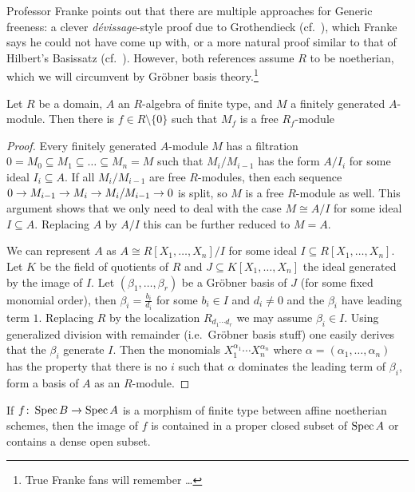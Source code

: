 \documentclass[a4paper,parskip=half,numbers=enddot, DIV=12]{scrreprt}
\begin{document}
Professor Franke points out that there are multiple approaches for Generic freeness: a clever \emph{dévissage}-style proof due to Grothendieck (cf.\ \cite[Theorem~14.4]{eisenbudCommAlg}), which Franke says he could not have come up with, or a more natural proof similar to that of Hilbert's Basissatz (cf.\ \cite[\S 24]{matsumuraCRT}). However, both references assume $R$ to be noetherian, which we will circumvent by Gröbner basis theory.\footnote{True Franke fans will remember \ldots}
\begin{prop}
	Let $R$ be a domain, $A$ an $R$-algebra of finite type, and $M$ a finitely generated $A$-module. Then there is $f\in R\setminus\{0\}$ such that $M_f$ is a free $R_f$-module
\end{prop}
\begin{proof}
	Every finitely generated $A$-module $M$ has a filtration $0=M_0\subseteq M_1\subseteq \ldots\subseteq M_n=M$ such that $M_i/M_{i-1}$ has the form $A/I_i$ for some ideal $I_i\subseteq A$. If all $M_i/M_{i-1}$ are free $R$-modules, then each sequence $0\morphism M_{i-1}\morphism M_i\morphism M_i/M_{i-1}\morphism 0$ is split, so $M$ is a free $R$-module as well. This argument shows that we only need to deal with the case $M\cong A/I$ for some ideal $I\subseteq A$. Replacing $A$ by $A/I$ this can be further reduced to $M=A$.
	
	We can represent $A$ as $A\cong R[X_1,\ldots,X_n]/I$ for some ideal $I\subseteq R[X_1,\ldots,X_n]$. Let $K$ be the field of quotients of $R$ and $J\subseteq K[X_1,\ldots,X_n]$ the ideal generated by the image of $I$. Let $(\beta_1,\ldots,\beta_r)$ be a Gröbner basis of $J$ (for some fixed monomial order), then $\beta_i=\frac{b_i}{d_i}$ for some $b_i\in I$ and $d_i\neq 0$ and the $\beta_i$ have leading term $1$. Replacing $R$ by the localization $R_{d_1\cdots d_r}$ we may assume $\beta_i\in I$. Using generalized division with remainder (i.e.\ Gröbner basis stuff) one easily derives that the $\beta_i$ generate $I$. Then the monomials $X_1^{\alpha_1}\cdots X_n^{\alpha_n}$ where $\alpha=(\alpha_1,\ldots,\alpha_n)$ has the property that there is no $i$ such that $\alpha$ dominates the leading term of $\beta_i$, form a basis of $A$ as an $R$-module.
\end{proof}
\begin{prop}
	If $f\colon \Spec B\morphism\Spec A$ is a morphism of finite type between affine noetherian schemes, then the image of $f$ is contained in a proper closed subset of $\operatorname{Spec} A$ or contains a dense open subset.
\end{prop}
\end{document}
